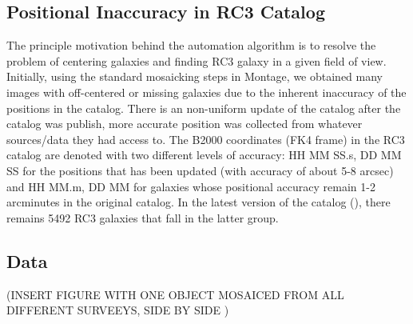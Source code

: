 \documentclass[5p]{elsarticle}
\begin{document}
	\subsection{Positional Inaccuracy in RC3 Catalog}
	The principle motivation behind the automation algorithm is to resolve the problem of centering galaxies and finding RC3 galaxy in a given field of view. Initially, using the standard mosaicking steps in Montage, we obtained many images with  off-centered or missing galaxies due to the inherent inaccuracy of the positions in the catalog. 
There is an non-uniform update of the catalog after the catalog was publish, more accurate position was collected from whatever sources/data they had access to.
The B2000 coordinates (FK4 frame) in the RC3 catalog are denoted with two different levels of accuracy: HH MM SS.s, DD MM SS for the positions that has been updated  (with accuracy of about 5-8 arcsec) and  HH MM.m, DD MM for galaxies whose positional accuracy remain  1-2 arcminutes in the original catalog.  In the latest version of the catalog (\citet{rc31991}), there remains 5492 RC3 galaxies that fall in the latter group.
\subsection{Data}

(INSERT FIGURE WITH ONE OBJECT MOSAICED FROM ALL DIFFERENT SURVEEYS, SIDE BY SIDE )
\end{document}
